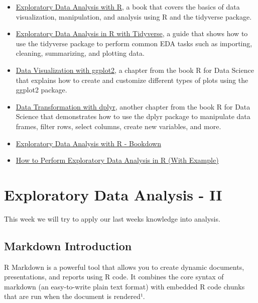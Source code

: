 \documentclass[
]{book}
\providecommand{\tightlist}{%
  \setlength{\itemsep}{0pt}\setlength{\parskip}{0pt}}
\begin{document}
\begin{itemize}
\tightlist
\item
  \href{https://tuos-bio-data-skills.github.io/intro-eda-book/index.html}{Exploratory Data Analysis with R}, a book that covers the basics of data visualization, manipulation, and analysis using R and the tidyverse package.
\item
  \href{https://www.pluralsight.com/guides/exploratory-data-analysis-in-r}{Exploratory Data Analysis in R with Tidyverse}, a guide that shows how to use the tidyverse package to perform common EDA tasks such as importing, cleaning, summarizing, and plotting data.
\item
  \href{https://r4ds.had.co.nz/data-visualisation.html}{Data Visualization with ggplot2}, a chapter from the book R for Data Science that explains how to create and customize different types of plots using the ggplot2 package.
\item
  \href{https://r4ds.had.co.nz/transform.html}{Data Transformation with dplyr}, another chapter from the book R for Data Science that demonstrates how to use the dplyr package to manipulate data frames, filter rows, select columns, create new variables, and more.
\item
  \href{https://bookdown.org/rdpeng/exdata/}{Exploratory Data Analysis with R - Bookdown}
\item
  \href{https://www.statology.org/exploratory-data-analysis-in-r/}{How to Perform Exploratory Data Analysis in R (With Example)}
\end{itemize}

\hypertarget{eda-2}{%
\chapter{Exploratory Data Analysis - II}\label{eda-2}}

This week we will try to apply our last weeks knowledge into analysis.

\hypertarget{markdown-introduction}{%
\section{Markdown Introduction}\label{markdown-introduction}}

R Markdown is a powerful tool that allows you to create dynamic documents, presentations, and reports using R code. It combines the core syntax of markdown (an easy-to-write plain text format) with embedded R code chunks that are run when the document is rendered¹.
\end{document}
